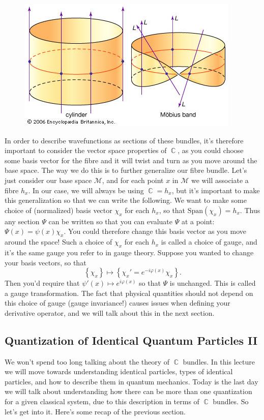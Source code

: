 \documentclass{article}
\DeclareMathOperator{\CC}{\mathbb{C}}
\begin{document}
\begin{figure}[h]
    \centering
    \includegraphics[width=\linewidth]{Figures/mobius_bundle.jpg}
    \caption*{}
    \label{fig:24}
\end{figure}

In order to describe wavefunctions as sections of these bundles, it's therefore important to consider the vector space properties of $\CC$, as you could choose some basis vector for the fibre and it will twist and turn as you move around the base space. The way we do this is to further generalize our fibre bundle. Let's just consider our base space $\mathcal{M}$, and for each point $x$ in $\mathcal{M}$ we will associate a fibre $h_x$. In our case, we will always be using $\CC = h_x$, but it's important to make this generalization so that we can write the following. We want to make some choice of (normalized) basis vector $\chi_x$ for each $h_x$, so that $\textrm{Span}(\chi_x) = h_x$. Thus any section $\Psi$ can be written so that you can evaluate $\Psi$ at a point: $\Psi(x) = \psi(x)\chi_x$. You could therefore change this basis vector as you move around the space! Such a choice of $\chi_x$ for each $h_x$ is called a choice of gauge, and it's the same gauge you refer to in gauge theory. Suppose you wanted to change your basis vectors, so that 
\[\left\{\chi_x \right\} \mapsto \left\{\chi_x'=e^{-i\varphi(x)}\chi_x\right\}.\] 
Then you'd require that $\psi'(x) \mapsto e^{i\varphi(x)}$ so that $\Psi$ is unchanged. This is called a gauge transformation. The fact that physical quantities should not depend on this choice of gauge (gauge invariance!) causes issues when defining your derivative operator, and we will talk about this in the next section.

\subsection{Quantization of Identical Quantum Particles II}
We won't spend too long talking about the theory of $\CC$ bundles. In this lecture we will move towards understanding identical particles, types of identical particles, and how to describe them in quantum mechanics. Today is the last day we will talk about understanding how there can be more than one quantization for a given classical system, due to this description in terms of $\CC$ bundles. So let's get into it. Here's some recap of the previous section.
\end{document}
